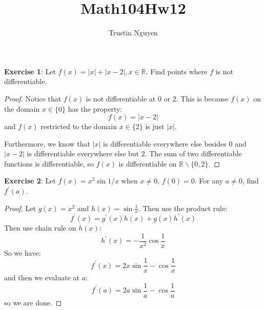 \documentclass{article}
\title{Math104Hw12}
\author{Trustin Nguyen}
\begin{document}
    \maketitle

\reversemarginpar

\textbf{Exercise 1}: Let $f(x) = \lvert x \rvert + \lvert x - 2 \rvert, x \in \mathbb{R}$. Find points where $f$ is not differentiable.
    \begin{proof}
        Notice that $f(x)$ is not differentiable at $0$ or $2$. This is because $f(x)$ on the domain $x \in \{ 0\}$ has the property:
            \begin{equation*}
                f(x) = \lvert x - 2\rvert
            \end{equation*}
        and $f(x)$ restricted to the domain $x \in \{ 2\}$ is just $\lvert x \rvert$.

        Furthermore, we know that $\lvert x \rvert$ is differentiable everywhere else besides $0$ and $\lvert x - 2 \rvert$ is differentiable everywhere else but $2$. The sum of two differentiable functions is differentiable, so $f(x)$ is differentiable on $\mathbb{R}\backslash \{ 0, 2\}$.
    \end{proof}

\textbf{Exercise 2}: Let $f(x) = x^{2}\sin{1/x}$ when $x \neq 0$, $f(0) = 0$. For any $a \neq 0$, find $f^{\prime}(a)$.
    \begin{proof}
        Let $g(x) = x^{2}$ and $h(x) = \sin{\frac{1}{x}}$. Then use the product rule:
            \begin{equation*}
                f^{\prime}(x) = g^{\prime}(x)h(x) + g(x)h^{\prime}(x)
            \end{equation*}
        Then use chain rule on $h(x)$:
            \begin{equation*}
                h^{\prime}(x) = -\dfrac{1}{x^{2}}\cos{\dfrac{1}{x}}
            \end{equation*}
        So we have:
            \begin{equation*}
                f^{\prime}(x) = 2x\sin{\dfrac{1}{x}} - \cos{\dfrac{1}{x}}
            \end{equation*}
        and then we evaluate at $a$:
            \begin{equation*}
                f^{\prime}(a) = 2a\sin{\dfrac{1}{a}} - \cos{\dfrac{1}{a}}
            \end{equation*}
        so we are done.
    \end{proof}
\end{document}
